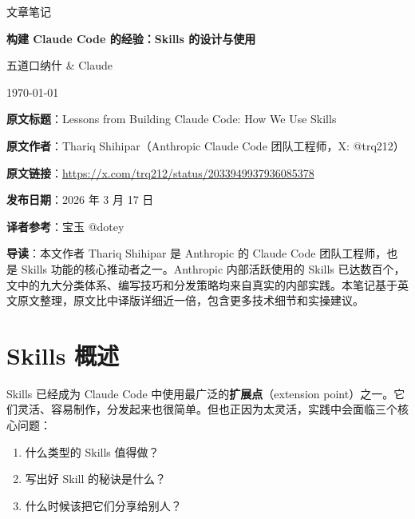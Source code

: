 \documentclass[a4paper]{article}
\newcommand{\notetitle}{构建 Claude Code 的经验：Skills 的设计与使用}
\newcommand{\noteauthors}{五道口纳什 \& Claude}
\newcommand{\notedate}{\today}
\begin{document}
\begin{titlepage}
\centering
{\Large 文章笔记\par}
\vspace{1.2cm}
{\huge\bfseries \notetitle\par}
\vspace{0.8cm}
{\large \noteauthors\par}
\vspace{0.3cm}
{\large \notedate\par}
\vspace{1.5cm}

\begin{tcolorbox}[width=0.9\textwidth, colback=black!2!white, colframe=black!60, sharp corners]
\textbf{原文标题}：Lessons from Building Claude Code: How We Use Skills\par
\textbf{原文作者}：Thariq Shihipar（Anthropic Claude Code 团队工程师，X: @trq212）\par
\textbf{原文链接}：\href{https://x.com/trq212/status/2033949937936085378}{https://x.com/trq212/status/2033949937936085378}\par
\textbf{发布日期}：2026 年 3 月 17 日\par
\textbf{译者参考}：宝玉 @dotey
\end{tcolorbox}

\vspace{1cm}

\begin{tcolorbox}[width=0.9\textwidth, colback=blue!3!white, colframe=blue!60, sharp corners]
\textbf{导读}：本文作者 Thariq Shihipar 是 Anthropic 的 Claude Code 团队工程师，也是 Skills 功能的核心推动者之一。Anthropic 内部活跃使用的 Skills 已达数百个，文中的九大分类体系、编写技巧和分发策略均来自真实的内部实践。本笔记基于英文原文整理，原文比中译版详细近一倍，包含更多技术细节和实操建议。
\end{tcolorbox}

\vfill
\end{titlepage}

\tableofcontents
\newpage


\section{Skills 概述}

Skills 已经成为 Claude Code 中使用最广泛的\textbf{扩展点}（extension point）之一。它们灵活、容易制作，分发起来也很简单。但也正因为太灵活，实践中会面临三个核心问题：
\begin{enumerate}
    \item 什么类型的 Skills 值得做？
    \item 写出好 Skill 的秘诀是什么？
    \item 什么时候该把它们分享给别人？
\end{enumerate}
\end{document}
